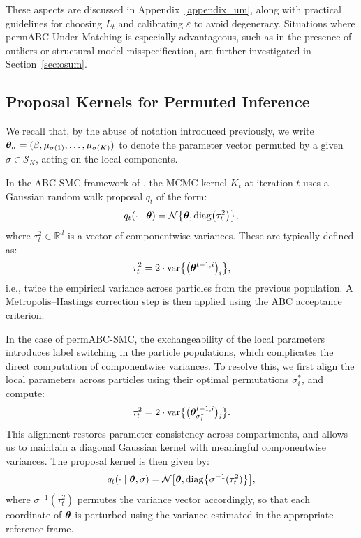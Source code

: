 These aspects are discussed in Appendix~\ref{appendix_um}, along with practical guidelines for choosing \( L_t \) and calibrating \( \varepsilon \) to avoid degeneracy. Situations where permABC-Under-Matching is especially advantageous, such as in the presence of outliers or structural model misspecification, are further investigated in Section~\ref{sec:osum}.

\subsection{Proposal Kernels for Permuted Inference}
\label{sec:kernels}


We recall that, by the abuse of notation introduced previously, we write \( \boldsymbol{\theta}_\sigma = (\beta, \mu_{\sigma(1)}, \dots, \mu_{\sigma(K)}) \) to denote the parameter vector permuted by a given \( \sigma \in \mathcal{S}_K \), acting on the local components.


In the ABC-SMC framework of \citet{delmoralAdaptiveSequentialMonte2012}, the MCMC kernel \( K_t \) at iteration \( t \) uses a Gaussian random walk proposal \( q_t \) of the form:
\[
q_t(\cdot \mid \boldsymbol{\theta}) = \mathcal{N}\bigl\{\boldsymbol{\theta}, \operatorname{diag}\bigl(\tau_t^2\bigr)\bigr\},
\]
where \( \tau_t^2 \in \mathbb{R}^d \) is a vector of componentwise variances. These are typically defined as:
\[
\tau_t^2 = 2 \cdot \operatorname{var}\bigl\{\bigl(\boldsymbol{\theta}^{t-1,i}\bigr)_i\bigr\},
\]
i.e., twice the empirical variance across particles from the previous population. A Metropolis–Hastings correction step is then applied using the ABC acceptance criterion.

In the case of permABC-SMC, the exchangeability of the local parameters introduces label switching in the particle populations, which complicates the direct computation of componentwise variances. To resolve this, we first align the local parameters across particles using their optimal permutations \( \sigma_i^* \), and compute:
\[
\tau_t^2 = 2 \cdot \operatorname{var}\bigl\{\bigl(\boldsymbol{\theta}_{\sigma_i^*}^{t-1,i}\bigr)_i\bigr\}.
\]
This alignment restores parameter consistency across compartments, and allows us to maintain a diagonal Gaussian kernel with meaningful componentwise variances. The proposal kernel is then given by:
\[
q_t(\cdot \mid \boldsymbol{\theta}, \sigma) = \mathcal{N}\bigl[\boldsymbol{\theta}, \operatorname{diag}\bigl\{\sigma^{-1}(\tau_t^2)\bigr\}\bigr],
\]
where \( \sigma^{-1}(\tau_t^2) \) permutes the variance vector accordingly, so that each coordinate of \( \boldsymbol{\theta} \) is perturbed using the variance estimated in the appropriate reference frame.

